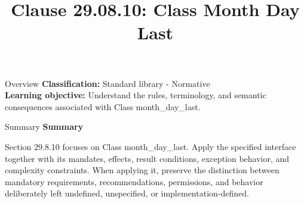 \documentclass[10pt,letterpaper]{article}
\title{Clause 29.08.10: Class Month Day Last}
\author{}
\date{}
\begin{document}
\maketitle
\begin{CornellOverviewBox}{Overview}
\textbf{Classification:} Standard library - Normative\\[2pt]
\textbf{Learning objective:} Understand the rules, terminology, and semantic consequences associated with Class month\_day\_last.
\end{CornellOverviewBox}\begin{CornellSummaryBox}{Summary}
{\sffamily\bfseries\color{Accent} Summary}\par\vspace{3pt}Section 29.8.10 focuses on Class month\_day\_last. Apply the specified interface together with its mandates, effects, result conditions, exception behavior, and complexity constraints. When applying it, preserve the distinction between mandatory requirements, recommendations, permissions, and behavior deliberately left undefined, unspecified, or implementation-defined.
\end{CornellSummaryBox}
\end{document}

